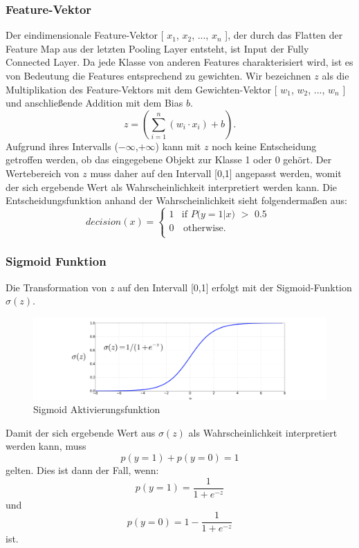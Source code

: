 \subsubsection{Feature-Vektor}
Der eindimensionale Feature-Vektor [ $x_{1}$, $x_{2}$, ..., $x_{n}$ ], der durch das Flatten der Feature Map aus der letzten Pooling Layer entsteht, ist Input der Fully Connected Layer. 
Da jede Klasse von anderen Features charakterisiert wird, ist es von Bedeutung die Features entsprechend zu gewichten. Wir bezeichnen $z$ als die Multiplikation des Feature-Vektors mit dem Gewichten-Vektor [ $w_{1}$, $w_{2}$, ..., $w_{n}$ ] und anschließende Addition mit dem Bias $b$.
\begin{equation}
z = ( \sum\limits_{i=1}^{n} (w_i\cdot x_i)+b ). \label{z}
\end{equation}
Aufgrund ihres Intervalls ($-\infty$,$+\infty$) kann mit $z$ noch keine Entscheidung getroffen werden, ob das eingegebene Objekt zur Klasse 1 oder 0 gehört. Der Wertebereich von $z$ muss daher auf den Intervall [0,1] angepasst werden, womit der sich ergebende Wert als Wahrscheinlichkeit interpretiert werden kann. Die Entscheidungsfunktion anhand der Wahrscheinlichkeit sieht folgendermaßen aus:
\begin{equation}
decision(x) = \left\{
\begin{array}{ll}
1 & \textrm{if $P$($y=$1$|$$x$) $>$ 0.5 }  \\
0 & \, \textrm{otherwise}. \\
\end{array}
\right. 
 \label{decision function} 
\end{equation}


\subsubsection{Sigmoid Funktion}
Die Transformation von $z$ auf den Intervall  [0,1] erfolgt mit der Sigmoid-Funktion $\sigma(z)$. 
\begin{figure}[H]
\centering
\includegraphics[width=0.7\linewidth]{pic/Klassifikation/sigmoid.png}
\caption{\label{pic:sigmoid} Sigmoid Aktivierungsfunktion}
\end{figure}

Damit der sich ergebende Wert aus $\sigma(z)$ als Wahrscheinlichkeit interpretiert werden kann, muss \begin{equation}
p(y=1) + p(y=0) = 1 \label{Wahrscheinlichkeit} 
\end{equation}
gelten. Dies ist dann der Fall, wenn:
\begin{equation}
p(y=1) =  \frac{1}{1+e^{-z} }  \label{p(y=1)}  
\end{equation}
und
\begin{equation}
p(y=0) =  1 - \frac{1}{1+e^{-z} }  \label{p(y=0)}  
\end{equation}
ist.


